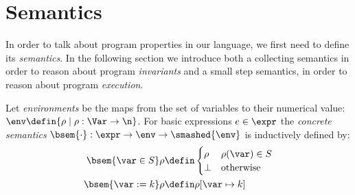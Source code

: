 \section{Semantics}

In order to talk about program properties in our language, we first
need to define its \emph{semantics}. In the following section we
introduce both a collecting semantics in order to reason about program
\emph{invariants} and a small step semantics, in order to reason about
program \emph{execution}.%

\begin{definition}
  Let \emph{environments} be the maps from the set of variables to
  their numerical value:
  \(\env \defin \{\rho \mid \rho : \Var \to \n\}\). For basic
  expressions \(e \in \expr\) the \emph{concrete semantics}
  \(\bsem{ \cdot} : \expr \to \env \to \smashed{\env}\) is
  inductively defined by:
  \begin{align*}
    \bsem{\var\in S} \rho & \defin \begin{cases} \rho & \rho(\var)\in S \\ \bot & \text{otherwise} \end{cases} \\
    \bsem{\var:= k} \rho & \defin \rho [\var\mapsto k] \\

\end{align*}
\end{definition}
